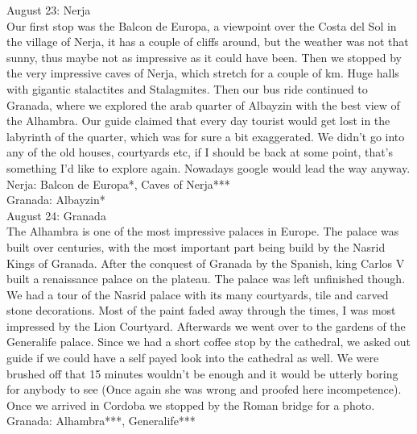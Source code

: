 August 23: Nerja\\
Our first stop was the Balcon de Europa, a viewpoint over the Costa del Sol in the village of Nerja, it has a couple of cliffs around, but the weather was not that sunny, thus maybe not as impressive as it could have been. Then we stopped by the very impressive caves of Nerja, which stretch for a couple of km. Huge halls with gigantic stalactites and Stalagmites. Then our bus ride continued to Granada, where we explored the arab quarter of Albayzin with the best view of the Alhambra. Our guide claimed that every day tourist would get lost in the labyrinth of the quarter, which was for sure a bit exaggerated. We didn't go into any of the old houses, courtyards etc, if I should be back at some point, that's something I'd like to explore again. Nowadays google would lead the way anyway.\\


Nerja: Balcon de Europa*, Caves of Nerja***\\
Granada: Albayzin*\\

August 24: Granada\\
The Alhambra is one of the most impressive palaces in Europe. The palace was built over centuries, with the most important part being build by the Nasrid Kings of Granada. After the conquest of Granada by the Spanish, king Carlos V built a renaissance palace on the plateau. The palace was left unfinished though. We had a tour of the Nasrid palace with its many courtyards, tile and carved stone decorations. Most of the paint faded away through the times, I was most impressed by the Lion Courtyard. Afterwards we went over to the gardens of the Generalife palace. Since we had a short coffee stop by the cathedral, we asked out guide if we could have a self payed look into the cathedral as well. We were brushed off that 15 minutes wouldn't be enough and it would be utterly boring for anybody to see (Once again she was wrong and proofed here incompetence). Once we arrived in Cordoba we stopped by the Roman bridge for a photo.\\

Granada: Alhambra***, Generalife***\\

